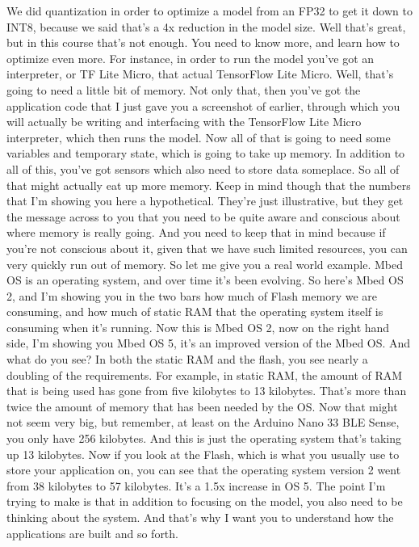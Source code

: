 We did quantization in order to optimize a model from an FP32
to get it down to INT8, because we said that's a 4x reduction in the model
size.
Well that's great, but in this course that's not enough.
You need to know more, and learn how to optimize even more.
For instance, in order to run the model you've
got an interpreter, or TF Lite Micro, that actual TensorFlow Lite Micro.
Well, that's going to need a little bit of memory.
Not only that, then you've got the application code
that I just gave you a screenshot of earlier, through which you
will actually be writing and interfacing with the TensorFlow Lite Micro
interpreter, which then runs the model.
Now all of that is going to need some variables and temporary state, which
is going to take up memory.
In addition to all of this, you've got sensors which
also need to store data someplace.
So all of that might actually eat up more memory.
Keep in mind though that the numbers that I'm
showing you here a hypothetical.
They're just illustrative, but they get the message across to you
that you need to be quite aware and conscious about where memory is really
going.
And you need to keep that in mind because if you're not
conscious about it, given that we have such limited resources,
you can very quickly run out of memory.
So let me give you a real world example.
Mbed OS is an operating system, and over time it's been evolving.
So here's Mbed OS 2, and I'm showing you in the two bars
how much of Flash memory we are consuming,
and how much of static RAM that the operating system
itself is consuming when it's running.
Now this is Mbed OS 2, now on the right hand side, I'm showing you Mbed OS 5,
it's an improved version of the Mbed OS.
And what do you see?
In both the static RAM and the flash, you
see nearly a doubling of the requirements.
For example, in static RAM, the amount of RAM that is being used
has gone from five kilobytes to 13 kilobytes.
That's more than twice the amount of memory that has been needed by the OS.
Now that might not seem very big, but remember, at least on the Arduino Nano
33 BLE Sense, you only have 256 kilobytes.
And this is just the operating system that's taking up 13 kilobytes.
Now if you look at the Flash, which is what you usually
use to store your application on, you can
see that the operating system version 2 went from 38 kilobytes to 57 kilobytes.
It's a 1.5x increase in OS 5.
The point I'm trying to make is that in addition to focusing on the model,
you also need to be thinking about the system.
And that's why I want you to understand how the applications are
built and so forth.
